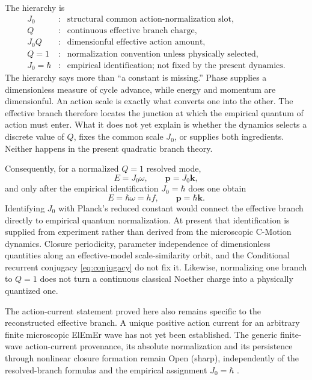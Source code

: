 \documentclass[11pt]{article}
\theoremstyle{definition}
\newcommand{\ElEmEr}{\mbox{ElEmEr}}
\begin{document}
The hierarchy is
\begin{equation}
 \boxed{
 \begin{array}{rcl}
 J_0 &:& \text{structural common action-normalization slot},\\
 Q &:& \text{continuous effective branch charge},\\
 J_0Q &:& \text{dimensionful effective action amount},\\
 Q=1 &:& \text{normalization convention unless physically selected},\\
 J_0=\hbar &:& \text{empirical identification; not fixed by the present dynamics}.
 \end{array}}
 \label{eq:hierarchy}
\end{equation}
The hierarchy says more than ``a constant is missing.''  Phase supplies a dimensionless measure
of cycle advance, while energy and momentum are dimensionful.  An action scale is exactly what
converts one into the other.  The effective branch therefore locates the junction at which the
empirical quantum of action must enter.  What it does not yet explain is whether the dynamics
selects a discrete value of $Q$, fixes the common scale $J_0$, or supplies both ingredients.
Neither happens in the present quadratic branch theory.

Consequently, for a normalized $Q=1$ resolved mode,
\begin{equation}
 E=J_0\omega,\qquad \mathbf p=J_0\mathbf k,
 \label{eq:Jrelations}
\end{equation}
and only after the empirical identification $J_0=\hbar$ does one obtain
\begin{equation}
 E=\hbar\omega=hf,
 \qquad
 \mathbf p=\hbar\mathbf k.
 \label{eq:empiricalPlanck}
\end{equation}
Identifying $J_0$ with Planck's reduced constant would connect the effective branch directly
to empirical quantum normalization.  At present that identification is supplied from
experiment rather than derived from the microscopic C-Motion dynamics.  Closure periodicity,
parameter independence of dimensionless quantities along an effective-model
scale-similarity orbit, and the Conditional recurrent conjugacy
\eqref{eq:conjugacy} do not fix it.  Likewise, normalizing one branch to $Q=1$ does not turn a
continuous classical Noether charge into a physically quantized one.

The action-current statement proved here also remains specific to the reconstructed effective
branch.  A unique positive action current for an arbitrary finite microscopic \ElEmEr{} wave
has not yet been established. The generic finite-wave action-current provenance,
its absolute normalization and its persistence through nonlinear closure
formation remain Open (sharp), independently of the resolved-branch formulas
and the empirical assignment $J_0=\hbar$ \cite{CmotionMainFramework2026}.
\end{document}
